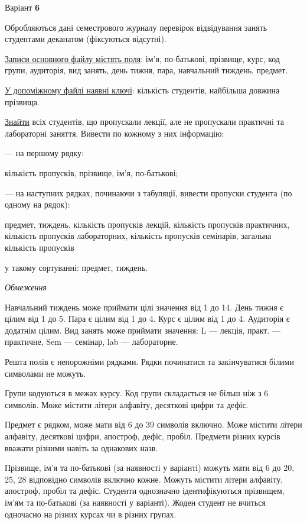 \documentclass[11pt, ukrainian]{article}
\begin{document}
\par
\newpage
{\center Варіант  \No \textbf { 6 }\par}
\bigskip
Обробляються дані семестрового журналу перевірок відвідування занять студентами деканатом (фіксуються відсутні). 

\underline{Записи основного файлу містять поля}: ім’я, по-батькові, прізвище, курс, код групи, аудиторія, вид занять, день тижня, пара, навчальний тиждень, предмет.

\underline{У допоміжному файлі наявні ключі}: кількість студентів, найбільша довжина прізвища.

\underline{Знайти} всіх студентів, що пропускали лекції, але не пропускали практичні та лабораторні заняття. Вивести по кожному з них інформацію:\par
{\noindent}--- на першому рядку:\par
кількість пропусків, прізвище, ім’я, по-батькові;

{\noindent}--- на наступних рядках, починаючи з табуляції, вивести пропуски студента (по одному на рядок):\par
предмет, тиждень, кількість пропусків лекцій, кількість пропусків практичних, кількість пропусків лабораторних, кількість пропусків семінарів, загальна кількість пропусків

{\noindent}у такому сортуванні: предмет, тиждень.


\bigskip\textit{Обмеження}

Навчальний тиждень може приймати цілі значення від 1 до 14.
День тижня є цілим від 1 до 5. Пара є цілим від 1 до 4.
Курс є цілим від 1 до 4. Аудиторія є додатнім цілим.
Вид занять може приймати значення:
L --- лекція, практ. --- практичне, Sem --- семінар, lab --- лабораторне.

Решта полів є непорожніми рядками.
Рядки починатися та закінчуватися білими символами не можуть.

Групи кодуються в межах курсу.
Код групи складається не більш ніж з 6 символів.
Може містити літери алфавіту, десяткові цифри та дефіс.

Предмет є рядком, може мати від 6 до 39 символів включно.
Може містити літери алфавіту, десяткові цифри, апостроф, дефіс, пробіл.
Предмети різних курсів вважати різними навіть за однакових назв.

Прізвище, ім’я та по-батькові (за наявності у варіанті)
можуть мати від 6 до 20, 25, 28 відповідно символів включно кожне.
Можуть містити літери алфавіту, апостроф, пробіл та дефіс.
Студенти однозначно ідентифікуються прізвищем, ім’ям та по-батькові (за наявності у варіанті).
Жоден студент не вчиться одночасно на різних курсах чи в різних групах.
\end{document}

